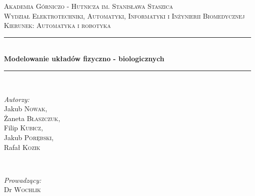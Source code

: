 \begin{titlepage}

\newcommand{\HRule}{\rule{\linewidth}{0.5mm}} %

\center %
 

\textsc{\LARGE Akademia Górniczo - Hutnicza im. Stanisława Staszica}\\[1.5cm] %
\textsc{\Large Wydział Elektrotechniki, Automatyki, Informatyki i Inżynierii Biomedycznej}\\[0.5cm] %
\textsc{\large Kierunek: Automatyka i robotyka}\\[0.5cm] %


\HRule \\[0.4cm]
{ \huge \bfseries Modelowanie układów fizyczno - biologicznych}\\[0.4cm] %
\HRule \\[1.5cm]
 
%
\begin{minipage}{0.4\textwidth}
\begin{flushleft} \large
\emph{Autorzy:}\\
Jakub \textsc{Nowak},\\ 
Żaneta \textsc{Błaszczuk},\\ 
Filip \textsc{Kubicz}, \\
Jakub \textsc{Porębski}, \\
Rafał \textsc{Kozik}%
\end{flushleft}
\end{minipage}
~
\begin{minipage}{0.4\textwidth}
\begin{flushright} \large
\emph{Prowadzący:} \\
Dr  \textsc{Wochlik} %
\end{flushright}
\end{minipage}\\[4cm]



\end{titlepage}
